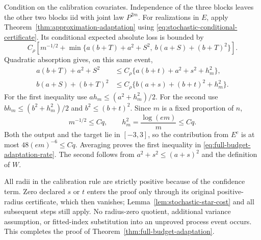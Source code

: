 Condition on the calibration covariates. Independence of the three
blocks leaves the other two blocks iid with joint law $P^{2m}$.
For realizations in $E$, apply
Theorem~\ref{thm:approximation-adaptation} using
\eqref{eq:stochastic-conditional-certificate}. Its conditional
expected absolute loss is bounded by
\[
 C_\rho\left[m^{-1/2}+
 \min\{a(b+T)+a^2+S^2,\ b(a+S)+(b+T)^2\}\right].
\]
Quadratic absorption gives, on this same event,
\begin{align*}
 a(b+T)+a^2+S^2
 &\le C_\rho\{a(b+t)+a^2+s^2+h_m^2\},\\
 b(a+S)+(b+T)^2
 &\le C_\rho\{b(a+s)+(b+t)^2+h_m^2\}.
\end{align*}
For the first inequality use $ah_m\le(a^2+h_m^2)/2$.
For the second use $bh_m\le(b^2+h_m^2)/2$ and
$b^2\le(b+t)^2$. Since $m$ is a fixed proportion of $n$,
\[
 m^{-1/2}\le Cq,\qquad
 h_m^2=\frac{\log(em)}m\le Cq.
\]
Both the output and the target lie in $[-3,3]$, so the contribution
from $E^c$ is at most $48(em)^{-6}\le Cq$. Averaging proves the
first inequality in \eqref{eq:full-budget-adaptation-rate}.
The second follows from $a^2+s^2\le(a+s)^2$ and the definition
of $W$.

All radii in the calibration rule are strictly positive because of
the confidence term. Zero declared $s$ or $t$ enters the proof only
through its original positive-radius certificate, which then
vanishes; Lemma~\ref{lem:stochastic-star-cost} and all subsequent
steps still apply. No radius-zero quotient, additional variance
assumption, or fitted-index substitution into an unproved process
event occurs. This completes the proof of
Theorem~\ref{thm:full-budget-adaptation}.
